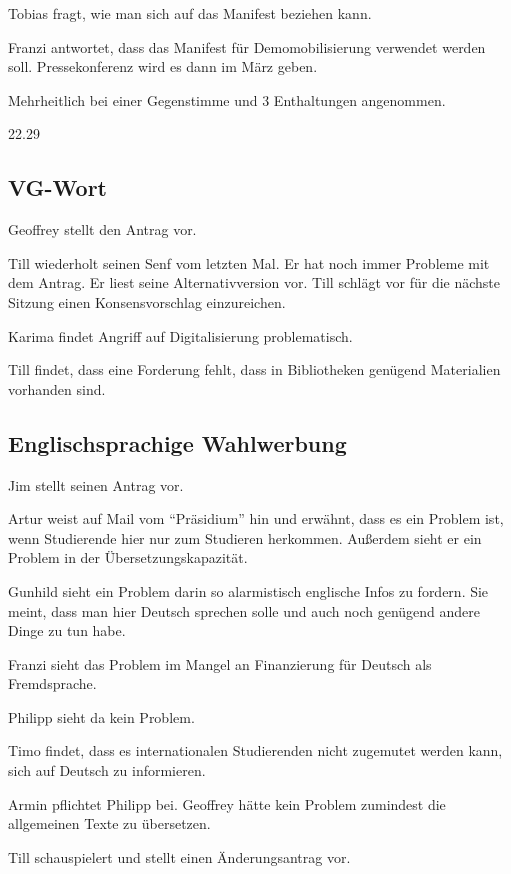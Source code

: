 \documentclass[ngerman,headheight=70pt]{scrartcl}
\begin{document}
    Tobias fragt, wie man sich auf das Manifest beziehen kann.

    Franzi antwortet, dass das Manifest für Demomobilisierung verwendet werden soll.
    Pressekonferenz wird es dann im März geben.

    Mehrheitlich bei einer Gegenstimme und 3 Enthaltungen angenommen.

    22.29
    \subsection{VG-Wort}

    Geoffrey stellt den Antrag vor.

    Till wiederholt seinen Senf vom letzten Mal. Er hat noch immer Probleme
    mit dem Antrag. Er liest seine Alternativversion vor. Till schlägt vor
    für die nächste Sitzung einen Konsensvorschlag einzureichen.

    Karima findet Angriff auf Digitalisierung problematisch.

    Till findet, dass eine Forderung fehlt, dass in Bibliotheken genügend
    Materialien vorhanden sind.

    \subsection{Englischsprachige Wahlwerbung}

    Jim stellt seinen Antrag vor.

    Artur weist auf Mail vom ``Präsidium'' hin und erwähnt, dass es ein Problem
    ist, wenn Studierende hier nur zum Studieren herkommen. Außerdem sieht
    er ein Problem in der Übersetzungskapazität.

    Gunhild sieht ein Problem darin so alarmistisch englische Infos zu fordern.
    Sie meint, dass man hier Deutsch sprechen solle und auch noch genügend andere
    Dinge zu tun habe.

    Franzi sieht das Problem im Mangel an Finanzierung für Deutsch als Fremdsprache.

    Philipp sieht da kein Problem.

    Timo findet, dass es internationalen Studierenden nicht zugemutet werden kann,
    sich auf Deutsch zu informieren.

    Armin pflichtet Philipp bei. Geoffrey hätte kein Problem zumindest die
    allgemeinen Texte zu übersetzen.

    Till schauspielert und stellt einen Änderungsantrag vor.
\end{document}
